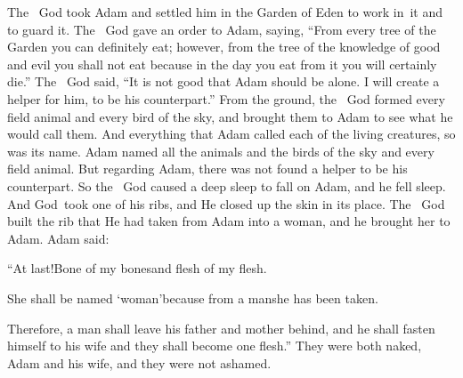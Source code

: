 \begin{inparaenum}
   The \lord\ God took Adam and settled him in the Garden of Eden to work in\understood\ it and to guard it.%
   The \lord\ God gave an order to Adam, saying, ``From every tree of the Garden you can definitely eat;%
   however, from the tree of the knowledge of good and evil you shall not eat because in the day you eat from it you will certainly die.''%
   The \lord\ God said, ``It is not good that Adam should be alone. I will create a helper for him, to be his counterpart.''%
   From the ground, the \lord\ God formed every field animal and every bird of the sky, and brought them to Adam to see what he would call them. And everything that Adam called each of the living creatures, so was its name.%
   Adam named all the animals and the birds of the sky and every field animal. But regarding Adam, there was not found a helper to be his counterpart.%
   So the \lord\ God caused a deep sleep to fall on Adam, and he fell sleep. And God\understood\ took one of his ribs, and He closed up the skin in its place.%
   The \lord\ God built the rib that He had taken from Adam into a woman, and he brought her to Adam.%
   Adam said:%
  
  \pc ``At last!\pa Bone of my bones\pa and flesh of my flesh.%
  
  \pc She shall be named `woman'\pa because from a man\pa she has been taken.%
  
   Therefore, a man shall leave his father and mother behind, and he shall fasten himself to his wife and they shall become one flesh.''%
   They were both naked, Adam and his wife, and they were not ashamed.%
\end{inparaenum}
